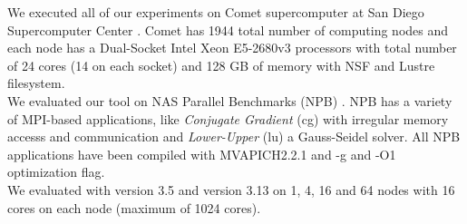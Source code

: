 We executed all of our experiments on Comet \cite{comet} supercomputer at San Diego Supercomputer Center . Comet has 1944 total number of computing nodes and each node has a Dual-Socket Intel Xeon E5-2680v3 processors with total number of 24 cores (14 on each socket) and 128 GB of memory with NSF and Lustre filesystem.\\
We evaluated our tool on NAS Parallel Benchmarks (NPB) \cite{nas}. NPB has a variety of MPI-based applications, like \textit{Conjugate Gradient} (cg) with irregular memory accesss and communication and \textit{Lower-Upper} (lu) a Gauss-Seidel solver. All NPB applications have been compiled with MVAPICH2.2.1 and -g and -O1 optimization flag.\\
We evaluated \parlot with \pin version 3.5 and \callgrind version 3.13 on 1, 4, 16 and 64 nodes with 16 cores on each node (maximum of 1024 cores).
